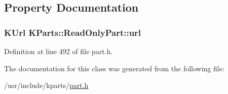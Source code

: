 \subsection{Property Documentation}
\hypertarget{classKParts_1_1ReadOnlyPart_a5b8edbf05a338814287496882adde559}{
\subsubsection[{url}]{\setlength{\rightskip}{0pt plus 5cm}K\+Url K\+Parts\+::\+Read\+Only\+Part\+::url\hspace{0.3cm}{\ttfamily [read]}}}\label{classKParts_1_1ReadOnlyPart_a5b8edbf05a338814287496882adde559}


Definition at line 492 of file part.\+h.



The documentation for this class was generated from the following file\+:\begin{DoxyCompactItemize}
\item 
/usr/include/kparts/\hyperlink{usr_2include_2kparts_2part_8h}{part.\+h}\end{DoxyCompactItemize}
